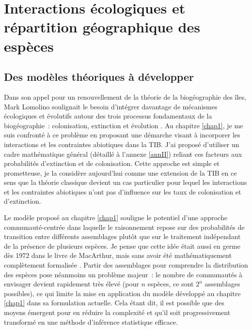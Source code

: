 \section*{Interactions écologiques et répartition géographique des
espèces}\label{interactions-uxe9cologiques-et-ruxe9partition-guxe9ographique-des-espuxe8ces}

\subsection*{Des modèles théoriques à
développer}\label{des-moduxe8les-thuxe9oriques-uxe0-duxe9velopper}

Dans son appel pour un renouvellement de la théorie de la biogéographie
des îles, Mark Lomolino soulignait le besoin d'intégrer davantage de
mécanismes écologiques et évolutifs autour des trois processus
fondamentaux de la biogéographie~: colonisation, extinction et évolution
\citep{Lomolino2000}. Au chapitre \ref{chap1}, je me suis confronté à ce
problème en proposant une démarche visant à incorporer les interactions
et les contraintes abiotiques dans la TIB. J'ai proposé d'utiliser un
cadre mathématique général (détaillé à l'annexe \ref{annII}) reliant ces
facteurs aux probabilités d'extinction et de colonisation. Cette
approche est simple et prometteuse, je la considère aujourd'hui comme
une extension de la TIB en ce sens que la théorie classique devient un
cas particulier pour lequel les interactions et les contraintes
abiotiques n'ont pas d'influence sur les taux de colonisation et
d'extinction.

Le modèle proposé au chapitre \ref{chap1} souligne le potentiel d'une
approche communauté-centrée dans laquelle le raisonnement repose sur des
probabilités de transition entre différents assemblages
\citep{Cazelles2016a} plutôt que sur le traitement indépendant de la
présence de plusieurs espèces. Je pense que cette idée était aussi en
germe dès 1972 dans le livre de MacArthur, mais sans avoir été
mathématiquement complètement formalisée
\citep{macarthur1972geographical}. Partir des assemblages pour
comprendre la distribution des espèces pose néanmoins un problème
majeur~: le nombre de communautés à envisager devient rapidement très
élevé (pour \(n\) espèces, ce sont \(2^n\) assemblages possibles), ce
qui limite la mise en application du modèle développé au chapitre
\ref{chap1} dans sa formulation actuelle. Cela étant dit, il est
possible que des moyens émergent pour en réduire la complexité et qu'il
soit progressivement transformé en une méthode d'inférence statistique
efficace.

